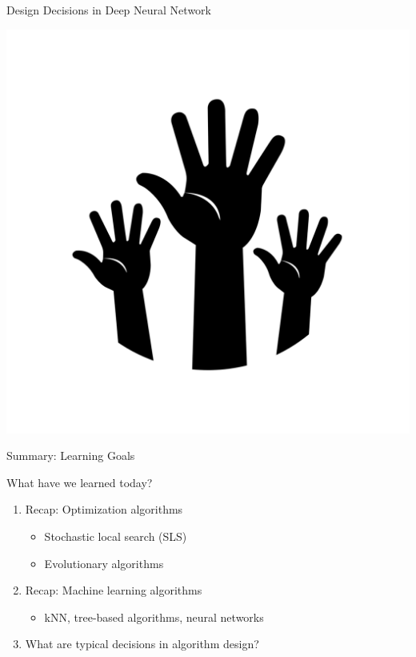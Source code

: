 \begin{frame}[c]{Design Decisions in Deep Neural Network}

\includegraphics[scale=0.05]{images/hands}

\end{frame}
\begin{frame}[c]{Summary: Learning Goals}

What have we learned today?

\begin{enumerate}
  \item Recap: Optimization algorithms
  \begin{itemize}
    \item Stochastic local search (SLS)
    \item Evolutionary algorithms
  \end{itemize}
  \item Recap: Machine learning algorithms
  \begin{itemize}
    \item kNN, tree-based algorithms, neural networks
  \end{itemize}
  \item What are typical decisions in algorithm design?
\end{enumerate}

\end{frame}
